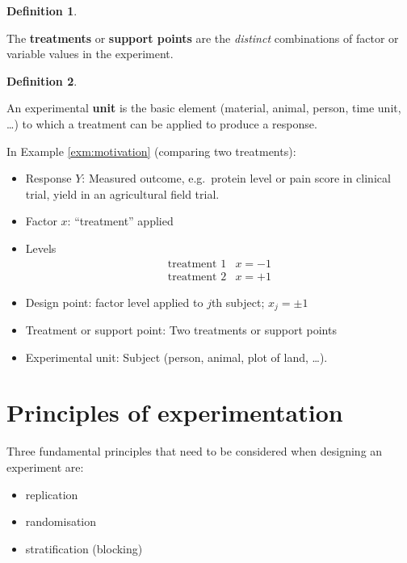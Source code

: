 \documentclass[
]{book}
\providecommand{\tightlist}{%
  \setlength{\itemsep}{0pt}\setlength{\parskip}{0pt}}
\theoremstyle{definition}
\newtheorem{definition}{Definition}[chapter]
\theoremstyle{definition}
\theoremstyle{definition}
\theoremstyle{definition}
\theoremstyle{remark}
\begin{document}
\begin{definition}
\protect\hypertarget{def:treatment}{}\label{def:treatment}

The \textbf{treatments} or \textbf{support points} are the \emph{distinct} combinations of factor or variable values in the experiment.

\end{definition}

\begin{definition}
\protect\hypertarget{def:unit}{}\label{def:unit}

An experimental \textbf{unit} is the basic element (material, animal, person, time unit, \ldots) to which a treatment can be applied to produce a response.

\end{definition}

In Example \ref{exm:motivation} (comparing two treatments):

\begin{itemize}
\tightlist
\item
  Response \(Y\): Measured outcome, e.g.~protein level or pain score in clinical trial, yield in an agricultural field trial.
\item
  Factor \(x\): ``treatment'' applied
\item
  Levels
  \[
  \begin{array}{ll}
  \textrm{treatment 1}&x =-1\\
  \textrm{treatment 2}&x =+1
  \end{array}
  \]
\item
  Design point: factor level applied to \(j\)th subject; \(x_{j}=\pm 1\)
\item
  Treatment or support point: Two treatments or support points
\item
  Experimental unit: Subject (person, animal, plot of land, \ldots).
\end{itemize}

\hypertarget{principles}{%
\section{Principles of experimentation}\label{principles}}

Three fundamental principles that need to be considered when designing an experiment are:

\begin{itemize}
\tightlist
\item
  replication
\item
  randomisation
\item
  stratification (blocking)
\end{itemize}
\end{document}
